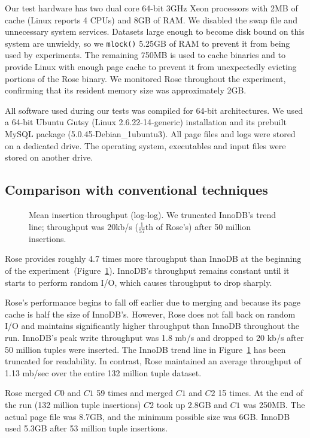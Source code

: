 \documentclass{vldb}
\newcommand{\rows}{Rose\xspace}
\newcommand{\rowss}{Rose's\xspace}
\newcommand{\xxx}[1]{\textcolor{red}{\bf XXX: #1}}
\renewcommand{\xxx}[1]{\xspace}
\begin{document}
Our test hardware has two dual core 64-bit 3GHz Xeon processors with
2MB of cache (Linux reports 4 CPUs) and 8GB of RAM.  We disabled the
swap file and unnecessary system services.  Datasets large enough to
become disk bound on this system are unwieldy, so we {\tt mlock()} 5.25GB of
RAM to prevent it from being used by experiments.
The remaining 750MB is used to cache
binaries and to provide Linux with enough page cache to prevent it
from unexpectedly evicting portions of the \rows binary.  We monitored
\rows throughout the experiment, confirming that its resident memory
size was approximately 2GB.

All software used during our tests was compiled for 64-bit
architectures.  We used a 64-bit Ubuntu Gutsy (Linux
2.6.22-14-generic) installation and its prebuilt MySQL package
(5.0.45-Debian\_1ubuntu3).  All page files and logs
were stored on a dedicated drive.  The operating system, executables
and input files were stored on another drive.

\subsection{Comparison with conventional techniques}

\begin{figure}
\centering {}
\caption{Mean insertion throughput (log-log).  We truncated InnoDB's
  trend line; throughput was 20kb/s ($\frac{1}{57}$th of \rowss)
  after 50 million insertions.}
\label{fig:avg-thru}
\end{figure}

\rows provides roughly 4.7 times more throughput than InnoDB at the
beginning of the experiment~(Figure~\ref{fig:avg-thru}).  InnoDB's
throughput remains constant until it starts to perform random
I/O, which causes throughput to drop sharply.

\rowss performance begins to fall off earlier due to merging and
because its page cache is half the size of InnoDB's.  However, \rows does
not fall back on random I/O and maintains significantly higher
throughput than InnoDB throughout the run.  InnoDB's peak write
throughput was 1.8 mb/s and dropped to 20 kb/s after 50 million tuples
were inserted.  The InnoDB trend line in Figure~\ref{fig:avg-thru} has
been truncated for readability.  In contrast, \rows maintained an
average throughput of 1.13 mb/sec over the entire 132 million tuple
dataset.

\rows merged $C0$ and $C1$ 59 times and merged $C1$ and $C2$ 15 times.
At the end of the run (132 million tuple insertions) $C2$ took up
2.8GB and $C1$ was 250MB.  The actual page
file was 8.7GB, and the minimum possible size was 6GB.\xxx{rerun to confirm pagefile size!}  InnoDB used
5.3GB after 53 million tuple insertions.
\end{document}
